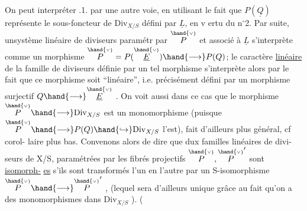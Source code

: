 On peut interpréter .1. par une autre voie, en utilisant le fait
que $P(\underline{Q})$ représente le  sous-foncteur de $\mathrm{Div}_{X/S}$ défini par
$\underline{L}$, en v ertu du n$^{\circ}$2. Par suite, unsystème linéaire de diviseurs paramétr
par $\overset{\hand{\scriptscriptstyle\vee}}{P}$ et associé à $\underline{L}$ s'interprète comme un morphisme $\overset{\hand{\scriptscriptstyle\vee}}{P} = P(\overset{\hand{\scriptscriptstyle\vee}}{\underline{E}})\hand{\longrightarrow} P(Q)$; le caractère
\uline{linéaire} de la famille de diviseurs définie par un tel morphisme
s'interprète alors par le fait que ce morphisme soit ``linéaire'', i.e.
précisément défini par un morphisme surjectif $Q\hand{\longrightarrow}\overset{\hand{\scriptscriptstyle\vee}}{\underline{E}}$ . \placedmargin{$\ulcorner$} On voit aussi
dans ce cas que le morphisme $\overset{\hand{\scriptscriptstyle\vee}}{P}\hand{\longrightarrow}\mathrm{Div}_{X/S}$ est un monomorphisme 
(puisque $\overset{\hand{\scriptscriptstyle\vee}}{P}\hand{\longrightarrow} P(Q)\hand{\hookrightarrow}\mathrm{Div}_{X/S}$ l'est), fait d'ailleurs plus général, cf corol-%
laire plus bas. Convenons alors de dire que dux familles linéaires de divi-%
seurs de X/S, paramétrées par les fibrés projectifs $\overset{\hand{\scriptscriptstyle\vee}}{P},\overset{\hand{\scriptscriptstyle\vee}}{P}'$ sont \uline{isomorph-}%
\uline{es} s'ils sont transformés l'un en l'autre par un S-isomorphisme $\overset{\hand{\scriptscriptstyle\vee}}{P}\hand{\longrightarrow}\overset{\hand{\scriptscriptstyle\vee}}{P}'$ ,
(lequel sera d'ailleurs unique grâce au fait qu'on a des monomorphismes
dans $\mathrm{Div}_{X/S}$ ). 
(

